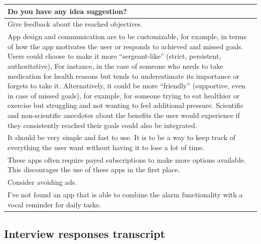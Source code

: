 \documentclass{article}
\begin{document}
\begin{table}[H]
    \centering
    \begin{tabularx}{0.9\textwidth}{X}
        \hline
        \textbf{Do you have any idea suggestion?} \\
        \hline
        Give feedback about the reached objectives. \\
        \hline
        App design and communication are to be customizable, for example, in terms of how the app motivates the user or responds to achieved and missed goals. Users could choose to make it more “sergeant-like” (strict, persistent, authoritative), For instance, in the case of someone who needs to take medication for health reasons but tends to underestimate its importance or forgets to take it. Alternatively, it could be more “friendly” (supportive, even in case of missed goals), for example, for someone trying to eat healthier or exercise but struggling and not wanting to feel additional pressure. Scientific and non-scientific anecdotes about the benefits the user would experience if they consistently reached their goals could also be integrated. \\
        \hline
        It should be very simple and fast to use. It is to be a way to keep track of everything the user want without having it to lose a lot of time. \\
        \hline
        These apps often require payed subscriptions to make more options available. This discourages the use of these apps in the first place. \\
        \hline
        Consider avoiding ads. \\
        \hline
        I've not found an app that is able to combine the alarm functionality with a vocal reminder for daily tasks. \\
        \hline
    \end{tabularx}
\end{table}

\subsection{Interview responses transcript}
\label{subsec:interview-responses}
\end{document}
